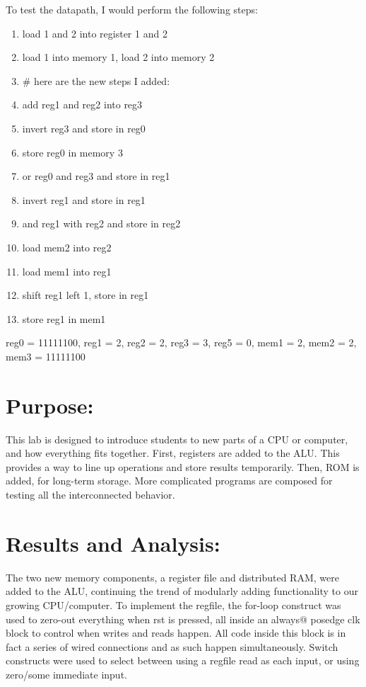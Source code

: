 \documentclass[12pt,a4paper]{article}
\begin{document}
To test the datapath, I would perform the following steps:
\begin{enumerate}
	\item load 1 and 2 into register 1 and 2
	\item load 1 into memory 1, load 2 into memory 2
	\item # here are the new steps I added:
	\item add reg1 and reg2 into reg3
	\item invert reg3 and store in reg0
	\item store reg0 in memory 3
	\item or reg0 and reg3 and store in reg1
	\item invert reg1 and store in reg1
	\item and reg1 with reg2 and store in reg2
	\item load mem2 into reg2
	\item load mem1 into reg1
	\item shift reg1 left 1, store in reg1
	\item store reg1 in mem1
\end{enumerate}
reg0 = 11111100,
reg1 = 2,
reg2 = 2,
reg3 = 3,
reg5 = 0,
mem1 = 2,
mem2 = 2,
mem3 = 11111100

\section*{Purpose:}

This lab is designed to introduce students to new parts of a CPU or computer,
and how everything fits together. First, registers are added to the ALU. This
provides a way to line up operations and store results temporarily. Then,
ROM is added, for long-term storage. More complicated programs are composed
for testing all the interconnected behavior.

\section*{Results and Analysis:}

The two new memory components, a register file and distributed RAM, were
added to the ALU, continuing the trend of modularly adding functionality
to our growing CPU/computer. To implement the regfile, the for-loop construct
was used to zero-out everything when rst is pressed, all
inside an always@ posedge clk block to control when writes and reads happen.
All code inside this block is in fact a series of wired connections and as
such happen simultaneously. Switch constructs were used to select between
using a regfile read as each input, or using zero/some immediate input. \\
\end{document}
